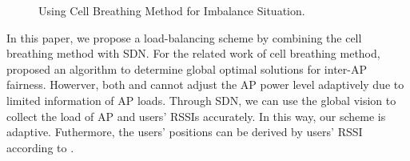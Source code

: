 \begin{figure}
	\centering
		
		
	\caption{Using Cell Breathing Method for Imbalance Situation.}
	\label{fig:cell-breathing}
\end{figure}

In this paper, we propose a load-balancing scheme by combining the cell breathing method with SDN. For the related work of cell breathing method, \cite{bejerano2009cell} proposed an algorithm to determine global optimal solutions for inter-AP fairness. Howerver, both \cite{bahl2007cell} and \cite{bejerano2009cell} cannot adjust the AP power level adaptively due to limited information of AP loads. Through SDN, we can use the global vision to collect the load of AP and users' RSSIs accurately. In this way, our scheme is adaptive. Futhermore, the users' positions can be derived by users' RSSI according to \cite{zaruba2007indoor}. 

